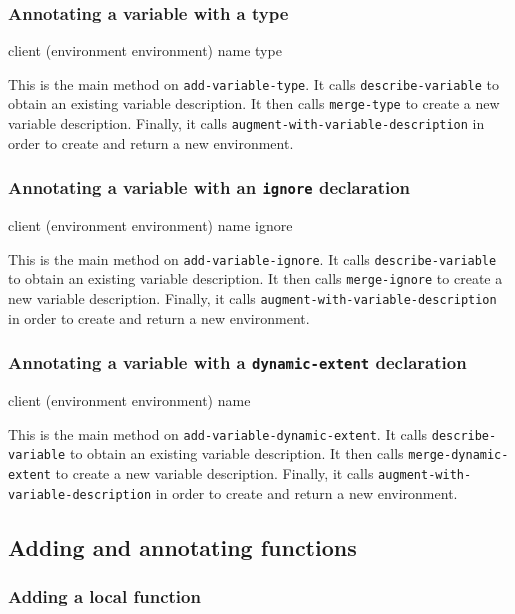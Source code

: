 \subsubsection{Annotating a variable with a type}

{\footnotesize
{}
{client
 (environment environment)
 name
 type}
}

This is the main method on \texttt{add-variable-type}.  It
calls \texttt{describe-variable} to obtain an existing variable
description.  It then calls \texttt{merge-type} to create a new
variable description.  Finally, it calls
\texttt{augment-with-variable-description} in order to create and
return a new environment.

\subsubsection{Annotating a variable with an \texttt{ignore} declaration}

{\footnotesize
{}
{client
 (environment environment)
 name
 ignore}
}

This is the main method on \texttt{add-variable-ignore}.  It
calls \texttt{describe-variable} to obtain an existing variable
description.  It then calls \texttt{merge-ignore} to create a new
variable description.  Finally, it calls
\texttt{augment-with-variable-description} in order to create and
return a new environment.

\subsubsection{Annotating a variable with a \texttt{dynamic-extent} declaration}

{\footnotesize
{}
{client
 (environment environment)
 name}
}

This is the main method on \texttt{add-variable-dynamic-extent}.  It
calls \texttt{describe-variable} to obtain an existing variable
description.  It then calls \texttt{merge-dynamic-extent} to create a new
variable description.  Finally, it calls
\texttt{augment-with-variable-description} in order to create and
return a new environment.

\subsection{Adding and annotating functions}

\subsubsection{Adding a local function}

